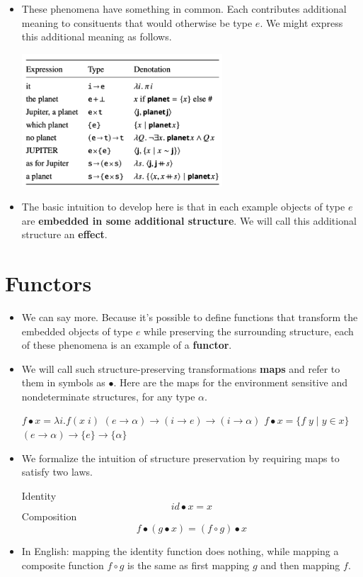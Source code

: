 \documentclass{article}
\begin{document}
\begin{itemize}
  \item These phenomena have something in common. Each contributes additional meaning to consituents that would
  otherwise be type $e$. We might express this additional meaning as follows.
  \begin{center}
    \includegraphics[width=7.5cm]{clips/3.png}
  \end{center}
  \item The basic intuition to develop here is that in each example objects of type $e$ are \textbf{embedded
    in some additional structure}. We will call this additional structure an \textbf{effect}.
\end{itemize}

\section{Functors}

\begin{itemize}
  \item We can say more. Because it's possible to define functions that transform the embedded objects of type $e$
    while preserving the surrounding structure, each of these phenomena is an example of a \textbf{functor}.
  \item We will call such structure-preserving transformations \textbf{maps} and refer to them in symbols as $\bullet$.
    Here are the maps for the environment sensitive and nondeterminate structures, for any type $\alpha$.
  \begin{exe}
    \ex $f \bullet x = \lambda i. f(x \; i)$ \hfill $(e \to \alpha) \to (i \to e) \to (i \to \alpha)$
    \ex $f \bullet x = \{f \; y \mid y \in x \}$ \hfill $(e \to \alpha) \to \{e\} \to \{\alpha\}$
  \end{exe}
  \item We formalize the intuition of structure preservation by requiring maps to satisfy two laws.
  \begin{exe}
    \ex Identity
      \[
          id \bullet x = x
      \]
    \ex Composition
      \[
        f \bullet (g \bullet x) = (f \circ g) \bullet x
      \]
  \end{exe}
  \item In English: mapping the identity function does nothing, while mapping a composite function $f \circ g$ is the same as
    first mapping $g$ and then mapping $f$.
\end{itemize}
\end{document}
